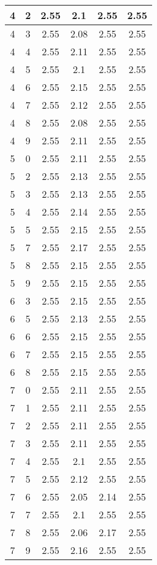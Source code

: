 \begin{longtable}{|c|c||c||c|c||c|}
	4 & 2 & 2.55 & 2.1 & 2.55 & 2.55 \\ \hline
	4 & 3 & 2.55 & 2.08 & 2.55 & 2.55 \\ \hline
	4 & 4 & 2.55 & 2.11 & 2.55 & 2.55 \\ \hline
	4 & 5 & 2.55 & 2.1 & 2.55 & 2.55 \\ \hline
	4 & 6 & 2.55 & 2.15 & 2.55 & 2.55 \\ \hline
	4 & 7 & 2.55 & 2.12 & 2.55 & 2.55 \\ \hline
	4 & 8 & 2.55 & 2.08 & 2.55 & 2.55 \\ \hline
	4 & 9 & 2.55 & 2.11 & 2.55 & 2.55 \\ \hline
	5 & 0 & 2.55 & 2.11 & 2.55 & 2.55 \\ \hline
	5 & 2 & 2.55 & 2.13 & 2.55 & 2.55 \\ \hline
	5 & 3 & 2.55 & 2.13 & 2.55 & 2.55 \\ \hline
	5 & 4 & 2.55 & 2.14 & 2.55 & 2.55 \\ \hline
	5 & 5 & 2.55 & 2.15 & 2.55 & 2.55 \\ \hline
	5 & 7 & 2.55 & 2.17 & 2.55 & 2.55 \\ \hline
	5 & 8 & 2.55 & 2.15 & 2.55 & 2.55 \\ \hline
	5 & 9 & 2.55 & 2.15 & 2.55 & 2.55 \\ \hline
	6 & 3 & 2.55 & 2.15 & 2.55 & 2.55 \\ \hline
	6 & 5 & 2.55 & 2.13 & 2.55 & 2.55 \\ \hline
	6 & 6 & 2.55 & 2.15 & 2.55 & 2.55 \\ \hline
	6 & 7 & 2.55 & 2.15 & 2.55 & 2.55 \\ \hline
	6 & 8 & 2.55 & 2.15 & 2.55 & 2.55 \\ \hline
	7 & 0 & 2.55 & 2.11 & 2.55 & 2.55 \\ \hline
	7 & 1 & 2.55 & 2.11 & 2.55 & 2.55 \\ \hline
	7 & 2 & 2.55 & 2.11 & 2.55 & 2.55 \\ \hline
	7 & 3 & 2.55 & 2.11 & 2.55 & 2.55 \\ \hline
	7 & 4 & 2.55 & 2.1 & 2.55 & 2.55 \\ \hline
	7 & 5 & 2.55 & 2.12 & 2.55 & 2.55 \\ \hline
	7 & 6 & 2.55 & 2.05 & 2.14 & 2.55 \\ \hline
	7 & 7 & 2.55 & 2.1 & 2.55 & 2.55 \\ \hline
	7 & 8 & 2.55 & 2.06 & 2.17 & 2.55 \\ \hline
	7 & 9 & 2.55 & 2.16 & 2.55 & 2.55 \\ \hline
\end{longtable}
